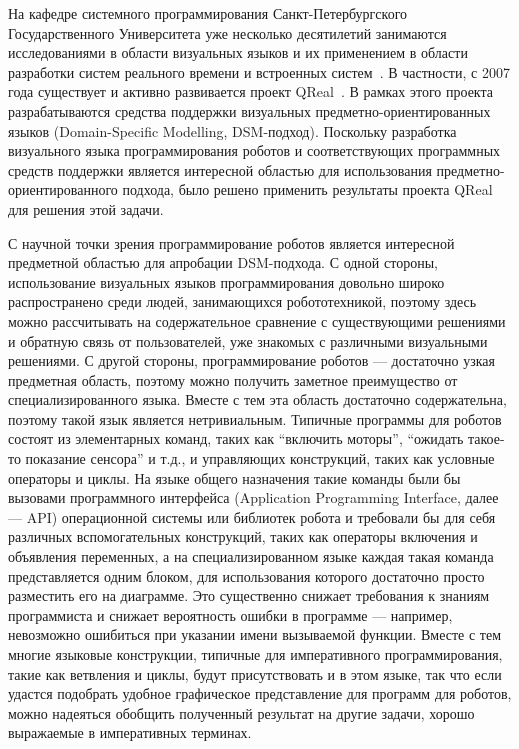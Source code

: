 \documentclass[a4paper]{article}
\begin{document}
На кафедре системного программирования Санкт-Петербургского Государственного Университета уже несколько десятилетий занимаются исследованиями в области визуальных языков и их применением в области разработки систем реального времени и встроенных систем~\cite{rtst1, rtst2, rtst3, videoDsl, dsmPlatforms, real1, real2, student1, student2, msfDsm, msfDsm2}. В частности, с 2007 года существует и активно развивается проект QReal~\cite{qReal}. В рамках этого проекта разрабатываются средства поддержки визуальных предметно-ориентированных языков (Domain-Specific Modelling, DSM-подход). Поскольку разработка визуального языка программирования роботов и соответствующих программных средств поддержки является интересной областью для использования предметно-ориентированного подхода, было решено применить результаты проекта QReal для решения этой задачи.  

С научной точки зрения программирование роботов является интересной предметной областью для апробации DSM-подхода. С одной стороны, использование визуальных языков программирования довольно широко распространено среди людей, занимающихся робототехникой, поэтому здесь можно рассчитывать на содержательное сравнение с существующими решениями и обратную связь от пользователей, уже знакомых с различными визуальными решениями. С другой стороны, программирование роботов --- достаточно узкая предметная область, поэтому можно получить заметное преимущество от специализированного языка. Вместе с тем эта область достаточно содержательна, поэтому такой язык является нетривиальным. Типичные программы для роботов состоят из элементарных команд, таких как ``включить моторы'', ``ожидать такое-то показание сенсора'' и т.д., и управляющих конструкций, таких как условные операторы и циклы. На языке общего назначения такие команды были бы вызовами программного интерфейса (Application Programming Interface, далее --- API) операционной системы или библиотек робота и требовали бы для себя различных вспомогательных конструкций, таких как операторы включения и объявления переменных, а на специализированном языке каждая такая команда представляется одним блоком, для использования которого достаточно просто разместить его на диаграмме. Это существенно снижает требования к знаниям программиста и снижает вероятность ошибки в программе --- например, невозможно ошибиться при указании имени вызываемой функции. Вместе с тем многие языковые конструкции, типичные для императивного программирования, такие как ветвления и циклы, будут присутствовать и в этом языке, так что если удастся подобрать удобное графическое представление для программ для роботов, можно надеяться обобщить полученный результат на другие задачи, хорошо выражаемые в императивных терминах.
\end{document}
